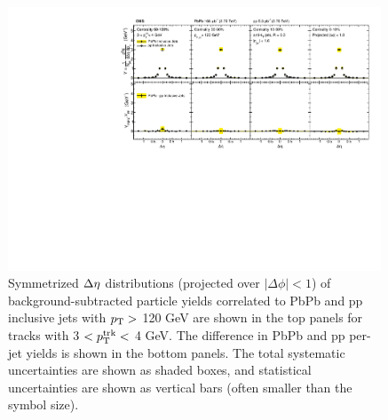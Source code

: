 \begin{figure}[hbt] 
\begin{center} 
\includegraphics[width=0.99\textwidth]{figures/Results/PAS_Figure_3_TrkPt3_TrkPt4.pdf}
\caption[Inclusive jet $\Delta\eta$ correlations for tracks with $3 < p_{\rm T}^{\rm trk} < 4$ GeV at 2.76 TeV]{Symmetrized $\protect\Delta\eta$ distributions (projected over $|\Delta\phi| < 1$) of background-subtracted particle yields correlated to PbPb and pp inclusive jets with $p_{\rm T}>$ 120 GeV are shown in the top panels for tracks with 3 $ < p_{\rm T}^{\rm trk} < $ 4 GeV.  The difference in PbPb and pp per-jet yields is shown in the bottom panels. The total systematic uncertainties are shown as shaded boxes, and statistical uncertainties are shown as vertical bars (often smaller than the symbol size).}
\label{fig:Inclusive_dEta3}
\end{center} 
\end{figure} 


